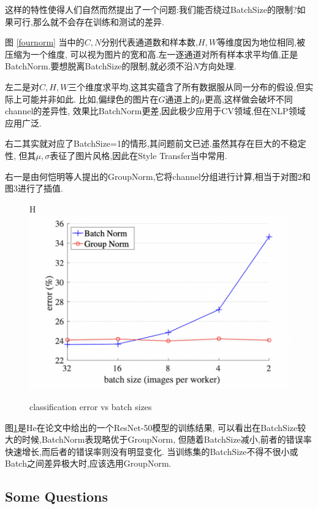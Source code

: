 这样的特性使得人们自然而然提出了一个问题:我们能否绕过BatchSize的限制?如果可行,那么就不会存在训练和测试的差异.

图 \ref{fournorm} 当中的$C,N$分别代表通道数和样本数,$H,W$等维度因为地位相同,被压缩为一个维度,
可以视为图片的宽和高.左一逐通道对所有样本求平均值,正是BatchNorm.要想脱离BatchSize的限制,就必须不沿$N$方向处理.

左二是对$C,H,W$三个维度求平均,这其实蕴含了所有数据服从同一分布的假设,但实际上可能并非如此.
比如,偏绿色的图片在$G$通道上的$\mu$更高,这样做会破坏不同channel的差异性,
效果比BatchNorm更差,因此极少应用于CV领域,但在NLP领域应用广泛.

右二其实就对应了BatchSize=1的情形,其问题前文已述.虽然其存在巨大的不稳定性,
但其$\mu, \sigma$表征了图片风格,因此在Style Transfer当中常用.

右一是由何恺明等人提出的GroupNorm,它将channel分组进行计算,相当于对图2和图3进行了插值.

\begin{figure}{H}
	\includegraphics[scale=0.30]{figures/GroupNorm.png}
	\caption{classification error vs batch sizes}
	\label{groupNorm}
\end{figure}

图\ref{groupNorm}是He在论文中给出的一个ResNet-50模型的训练结果,
可以看出在BatchSize较大的时候,BatchNorm表现略优于GroupNorm,
但随着BatchSize减小,前者的错误率快速增长,而后者的错误率则没有明显变化.
当训练集的BatchSize不得不很小或Batch之间差异极大时,应该选用GroupNorm.

\subsection{Some Questions}

